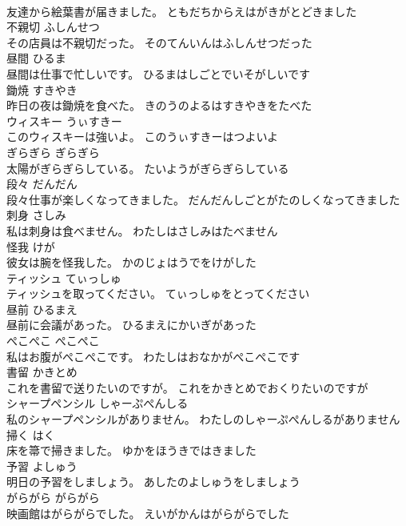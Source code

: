 \documentclass[8pt]{extreport}
\begin{document}
\begin{CJK}{UTF8}{min}
\\	友達から絵葉書が届きました。	ともだちからえはがきがとどきました	
\\	不親切	ふしんせつ	
\\	その店員は不親切だった。	そのてんいんはふしんせつだった	
\\	昼間	ひるま	
\\	昼間は仕事で忙しいです。	ひるまはしごとでいそがしいです	
\\	鋤焼	すきやき	
\\	昨日の夜は鋤焼を食べた。	きのうのよるはすきやきをたべた	
\\	ウィスキー	うぃすきー	
\\	このウィスキーは強いよ。	このうぃすきーはつよいよ	
\\	ぎらぎら	ぎらぎら	
\\	太陽がぎらぎらしている。	たいようがぎらぎらしている	
\\	段々	だんだん	
\\	段々仕事が楽しくなってきました。	だんだんしごとがたのしくなってきました	
\\	刺身	さしみ	
\\	私は刺身は食べません。	わたしはさしみはたべません	
\\	怪我	けが	
\\	彼女は腕を怪我した。	かのじょはうでをけがした	
\\	ティッシュ	てぃっしゅ	
\\	ティッシュを取ってください。	てぃっしゅをとってください	
\\	昼前	ひるまえ	
\\	昼前に会議があった。	ひるまえにかいぎがあった	
\\	ぺこぺこ	ぺこぺこ	
\\	私はお腹がぺこぺこです。	わたしはおなかがぺこぺこです	
\\	書留	かきとめ	
\\	これを書留で送りたいのですが。	これをかきとめでおくりたいのですが	
\\	シャープペンシル	しゃーぷぺんしる	
\\	私のシャープペンシルがありません。	わたしのしゃーぷぺんしるがありません	
\\	掃く	はく	
\\	床を箒で掃きました。	ゆかをほうきではきました	
\\	予習	よしゅう	
\\	明日の予習をしましょう。	あしたのよしゅうをしましょう	
\\	がらがら	がらがら	
\\	映画館はがらがらでした。	えいがかんはがらがらでした	

\end{CJK}
\end{document}
